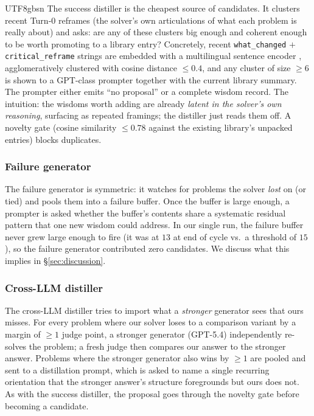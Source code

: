 \documentclass{article}
\begin{document}
\begin{CJK*}{UTF8}{gbsn}
The success distiller is the cheapest source of candidates. It
clusters recent Turn-0 reframes (the solver's own articulations
of what each problem is really about) and asks: are any of these
clusters big enough and coherent enough to be worth promoting to
a library entry? Concretely, recent
\texttt{what\_changed} \(+\) \texttt{critical\_reframe} strings are
embedded with a multilingual sentence encoder
\citep{reimers2019sbert}, agglomeratively clustered with cosine
distance \(\leq 0.4\), and any cluster of size \(\geq 6\) is
shown to a GPT-class prompter together with the current library
summary. The prompter either emits ``no proposal'' or a complete
wisdom record. The intuition: the wisdoms worth adding are
already \emph{latent in the solver's own reasoning}, surfacing as
repeated framings; the distiller just reads them off. A novelty
gate (cosine similarity \(\leq 0.78\) against the existing
library's unpacked entries) blocks duplicates.

\subsubsection{Failure generator}
\label{sec:failure}

The failure generator is symmetric: it watches for problems the
solver \emph{lost} on (or tied) and pools them into a failure
buffer. Once the buffer is large enough, a prompter is asked
whether the buffer's contents share a systematic residual pattern
that one new wisdom could address. In our single run, the
failure buffer never grew large enough to fire (it was at
\(13\) at end of cycle vs.\ a threshold of \(15\)), so the failure
generator contributed zero candidates. We discuss what this
implies in \S\ref{sec:discussion}.

\subsubsection{Cross-LLM distiller}
\label{sec:cross-llm}

The cross-LLM distiller tries to import what a \emph{stronger}
generator sees that ours misses. For every problem where our
solver loses to a comparison variant by a margin of \(\geq 1\)
judge point, a stronger generator (GPT-5.4) independently
re-solves the problem; a fresh judge then compares our answer
to the stronger answer. Problems where the stronger generator
also wins by \(\geq 1\) are pooled and sent to a distillation
prompt, which is asked to name a single recurring orientation
that the stronger answer's structure foregrounds but ours does
not. As with the success distiller, the proposal goes through
the novelty gate before becoming a candidate.


\end{CJK*}
\end{document}
